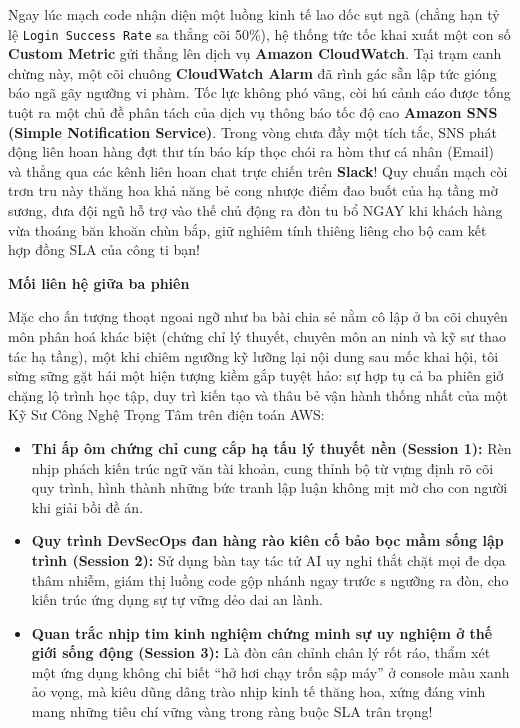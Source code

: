 Ngay lúc mạch code nhận diện một luồng kinh tế lao dốc sụt ngã (chẳng
hạn tỷ lệ \texttt{Login\ Success\ Rate} sa thẳng cõi 50\%), hệ thống tức
tốc khai xuất một con số \textbf{Custom Metric} gửi thẳng lên dịch vụ
\textbf{Amazon CloudWatch}. Tại trạm canh chừng này, một cõi chuông
\textbf{CloudWatch Alarm} đã rình gác sẵn lập tức gióng báo ngã gãy
ngưỡng vi phàm. Tốc lực không phó vãng, còi hú cảnh cáo được tống tuột
ra một chủ đề phân tách của dịch vụ thông báo tốc độ cao \textbf{Amazon
SNS (Simple Notification Service)}. Trong vòng chưa đầy một tích tắc,
SNS phát động liên hoan hàng đợt thư tín báo kíp thọc chói ra hòm thư cá
nhân (Email) và thẳng qua các kênh liên hoan chat trực chiến trên
\textbf{Slack}! Quy chuẩn mạch còi trơn tru này thăng hoa khả năng bẻ
cong nhược điểm đao buốt của hạ tầng mờ sương, đưa đội ngũ hỗ trợ vào
thế chủ động ra đòn tu bổ NGAY khi khách hàng vừa thoáng băn khoăn chùn
bắp, giữ nghiêm tính thiêng liêng cho bộ cam kết hợp đồng SLA của công
ti bạn!

\vspace{0.5em}\noindent\textbf{Mối liên hệ giữa ba
phiên}\par

Mặc cho ấn tượng thoạt ngoai ngỡ như ba bài chia sẻ nằm cô lập ở ba cõi
chuyên môn phân hoá khác biệt (chứng chỉ lý thuyết, chuyên môn an ninh
và kỹ sư thao tác hạ tầng), một khi chiêm ngưỡng kỹ lưỡng lại nội dung
sau mốc khai hội, tôi sừng sững gặt hái một hiện tượng kiềm gắp tuyệt
hảo: sự hợp tụ cả ba phiên giở chặng lộ trình học tập, duy trì kiến tạo
và thâu bẻ vận hành thống nhất của một Kỹ Sư Công Nghệ Trọng Tâm trên
điện toán AWS:

\begin{itemize}
\tightlist
\item
  \textbf{Thi ấp ôm chứng chỉ cung cắp hạ tấu lý thuyết nền (Session
  1):} Rèn nhịp phách kiến trúc ngữ văn tài khoản, cung thỉnh bộ từ vựng
  định rõ cõi quy trình, hình thành những bức tranh lập luận không mịt
  mờ cho con người khi giải bồi đề án.
\item
  \textbf{Quy trình DevSecOps đan hàng rào kiên cố bảo bọc mầm sống lập
  trình (Session 2):} Sử dụng bàn tay tác tử AI uy nghi thắt chặt mọi đe
  dọa thâm nhiễm, giám thị luồng code gộp nhánh ngay trước s ngưỡng ra
  đòn, cho kiến trúc ứng dụng sự tự vững dẻo dai an lành.
\item
  \textbf{Quan trắc nhịp tim kinh nghiệm chứng minh sự uy nghiệm ở thế
  giới sống động (Session 3):} Là đòn cân chỉnh chân lý rốt ráo, thẩm
  xét một ứng dụng không chỉ biết ``hở hơi chạy trốn sập máy'' ở console
  màu xanh ảo vọng, mà kiêu dũng dâng trào nhịp kinh tế thăng hoa, xứng
  đáng vinh mang những tiêu chí vững vàng trong ràng buộc SLA trân
  trọng!
\end{itemize}

